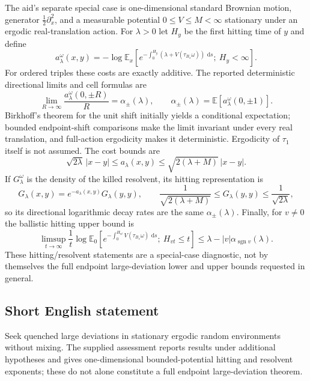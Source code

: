 \documentclass[11pt]{article}
\newcommand{\dd}{\,\mathrm{d}}
\begin{document}
The aid's separate special case is one-dimensional standard Brownian motion, generator $\tfrac12\partial_x^2$, and a measurable potential $0\le V\le M<\infty$ stationary under an ergodic real-translation action. For $\lambda>0$ let $H_y$ be the first hitting time of $y$ and define
\[
 a_\lambda^\omega(x,y)=-\log\mathbb E_x\left[
 e^{-\int_0^{H_y}(\lambda+V(\tau_{B_s}\omega))\,\dd s};\ H_y<\infty\right].
\]
For ordered triples these costs are exactly additive. The reported deterministic directional limits and cell formulas are
\[
 \lim_{R\to\infty}\frac{a_\lambda^\omega(0,\pm R)}R
 =\alpha_\pm(\lambda),\qquad
 \alpha_\pm(\lambda)=\mathbb E[a_\lambda^\omega(0,\pm1)].
\]
Birkhoff's theorem for the unit shift initially yields a conditional expectation; bounded endpoint-shift comparisons make the limit invariant under every real translation, and full-action ergodicity makes it deterministic. Ergodicity of $\tau_1$ itself is not assumed. The cost bounds are
\[
 \sqrt{2\lambda}\,|x-y|\le a_\lambda(x,y)
 \le\sqrt{2(\lambda+M)}\,|x-y|.
\]
If $G_\lambda^\omega$ is the density of the killed resolvent, its hitting representation is
\[
 G_\lambda(x,y)=e^{-a_\lambda(x,y)}G_\lambda(y,y),
 \qquad\frac1{\sqrt{2(\lambda+M)}}\le G_\lambda(y,y)
       \le\frac1{\sqrt{2\lambda}},
\]
so its directional logarithmic decay rates are the same $\alpha_\pm(\lambda)$. Finally, for $v\ne0$ the ballistic hitting upper bound is
\[
 \limsup_{t\to\infty}\frac1t\log
 \mathbb E_0\left[e^{-\int_0^{H_{vt}}V(\tau_{B_s}\omega)\,\dd s};\ H_{vt}\le t\right]
 \le\lambda-|v|\alpha_{\operatorname{sgn}v}(\lambda).
\]
These hitting/resolvent statements are a special-case diagnostic, not by themselves the full endpoint large-deviation lower and upper bounds requested in general.
\subsection{Short English statement}
Seek quenched large deviations in stationary ergodic random environments without mixing. The supplied assessment reports results under additional hypotheses and gives one-dimensional bounded-potential hitting and resolvent exponents; these do not alone constitute a full endpoint large-deviation theorem.
\end{document}
